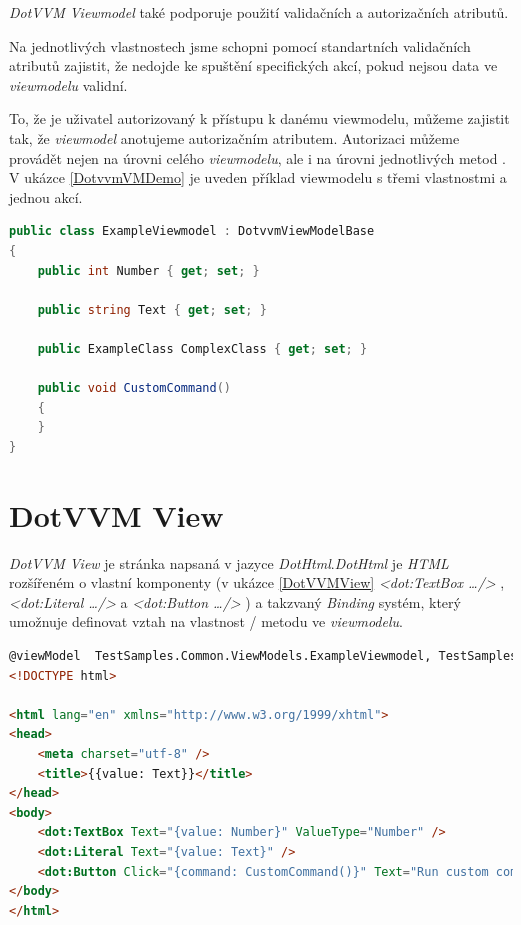 \emph{DotVVM Viewmodel} také podporuje použití validačních a autorizačních atributů.

Na jednotlivých vlastnostech jsme schopni pomocí standartních validačních atributů zajistit, že nedojde ke spuštění specifických akcí, pokud nejsou data ve \emph{viewmodelu} validní\cite{DotVVM-Validation}. 

To, že je uživatel autorizovaný k přístupu k danému viewmodelu, můžeme zajistit tak, že \emph{viewmodel} anotujeme autorizačním atributem. Autorizaci můžeme provádět nejen na úrovni celého \emph{viewmodelu}, ale i na úrovni jednotlivých metod \cite{DotvvmAuth}. V ukázce \ref{DotvvmVMDemo} je uveden příklad viewmodelu s třemi vlastnostmi a jednou akcí.

\begin{lstlisting}[language=c#, caption=Ukázka DotVVM Viewmodelu,label=DotvvmVMDemo,captionpos=t]
public class ExampleViewmodel : DotvvmViewModelBase
{
    public int Number { get; set; }

    public string Text { get; set; }

    public ExampleClass ComplexClass { get; set; }

    public void CustomCommand() 
    {
    }
}
\end{lstlisting}


\section{DotVVM View}
\emph{DotVVM View} je stránka napsaná v jazyce \emph{DotHtml}.\emph{DotHtml} je \emph{HTML} rozšířeném o vlastní komponenty (v ukázce \ref{DotVVMView}\emph{ <dot:TextBox \ldots />} , \emph{<dot:Literal \ldots />} a \emph{<dot:Button \ldots />} ) a takzvaný \emph{Binding} systém, který umožnuje definovat vztah na vlastnost / metodu ve \emph{viewmodelu}.

\begin{lstlisting}[language=html, caption=Ukázka DotHtml,captionpos=t,label=DotVVMView]
@viewModel  TestSamples.Common.ViewModels.ExampleViewmodel, TestSamples.Common
<!DOCTYPE html>

<html lang="en" xmlns="http://www.w3.org/1999/xhtml">
<head>
    <meta charset="utf-8" />
    <title>{{value: Text}}</title>
</head>
<body>
    <dot:TextBox Text="{value: Number}" ValueType="Number" />
    <dot:Literal Text="{value: Text}" />
    <dot:Button Click="{command: CustomCommand()}" Text="Run custom command" />
</body>
</html>
\end{lstlisting}

